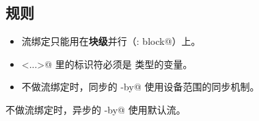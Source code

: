 \subsection*{规则}

\begin{itemize}[leftmargin=1.6em]
\item 流绑定只能用在\textbf{块级}并行（\co@: block@）上。
\item \co@<...>@ 里的标识符必须是 \co@stream@ 类型的变量。
\item 不做流绑定时，同步的 \co@parallel-by@ 使用设备范围的同步机制。
\end{itemize}

不做流绑定时，异步的 \co@parallel-by@ 使用默认流。
